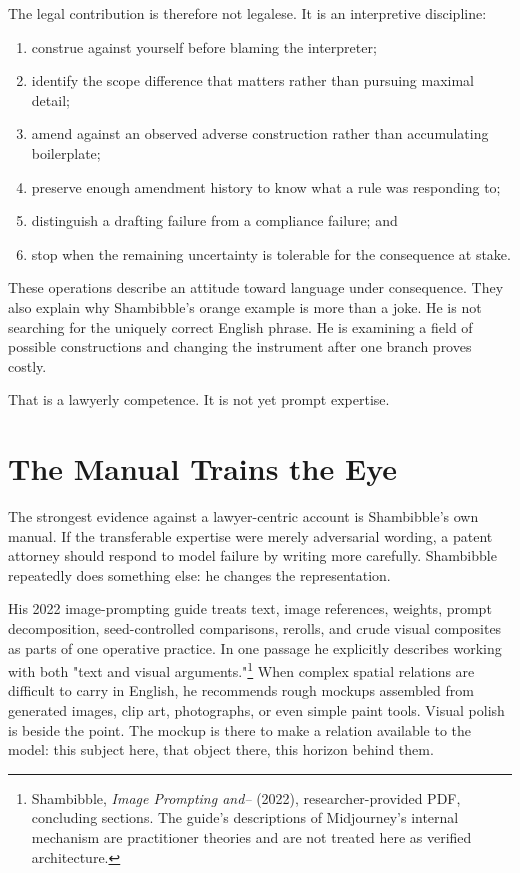 \documentclass[11pt]{article}
\begin{document}
The legal contribution is therefore not legalese. It is an interpretive discipline:

\begin{enumerate}[label=\arabic*.]
\item construe against yourself before blaming the interpreter;
\item identify the scope difference that matters rather than pursuing maximal detail;
\item amend against an observed adverse construction rather than accumulating boilerplate;
\item preserve enough amendment history to know what a rule was responding to;
\item distinguish a drafting failure from a compliance failure; and
\item stop when the remaining uncertainty is tolerable for the consequence at stake.
\end{enumerate}

These operations describe an attitude toward language under consequence. They also explain why Shambibble's orange example is more than a joke. He is not searching for the uniquely correct English phrase. He is examining a field of possible constructions and changing the instrument after one branch proves costly.

That is a lawyerly competence. It is not yet prompt expertise.

\section{The Manual Trains the Eye}

The strongest evidence against a lawyer-centric account is Shambibble's own manual. If the transferable expertise were merely adversarial wording, a patent attorney should respond to model failure by writing more carefully. Shambibble repeatedly does something else: he changes the representation.

His 2022 image-prompting guide treats text, image references, weights, prompt decomposition, seed-controlled comparisons, rerolls, and crude visual composites as parts of one operative practice. In one passage he explicitly describes working with both "text and visual arguments."\footnote{Shambibble, \textit{Image Prompting and--} (2022), researcher-provided PDF, concluding sections. The guide's descriptions of Midjourney's internal mechanism are practitioner theories and are not treated here as verified architecture.} When complex spatial relations are difficult to carry in English, he recommends rough mockups assembled from generated images, clip art, photographs, or even simple paint tools. Visual polish is beside the point. The mockup is there to make a relation available to the model: this subject here, that object there, this horizon behind them.
\end{document}
